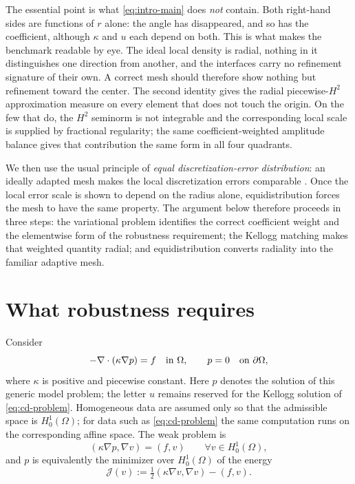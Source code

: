 \documentclass[10pt,pdftex]{amsart}%
\numberwithin{equation}{section}
\newcommand{\Jcal}{\mathcal{J}}
\begin{document}
The essential point is what \eqref{eq:intro-main} does \emph{not} contain.  Both right-hand sides are functions of $r$ alone: the angle has disappeared, and so has the coefficient, although $\kappa$ and $u$ each depend on both.  This is what makes the benchmark readable by eye.  The ideal local density is radial, nothing in it distinguishes one direction from another, and the interfaces carry no refinement signature of their own.  A correct mesh should therefore show nothing but refinement toward the center.  The second identity gives the radial piecewise-$H^2$ approximation measure on every element that does not touch the origin.  On the few that do, the $H^2$ seminorm is not integrable and the corresponding local scale is supplied by fractional regularity; the same coefficient-weighted amplitude balance gives that contribution the same form in all four quadrants.

We then use the usual principle of \emph{equal discretization-error distribution}: an ideally adapted mesh makes the local discretization errors comparable \cite{NV2012,CHZ17}.  Once the local error scale is shown to depend on the radius alone, equidistribution forces the mesh to have the same property.  The argument below therefore proceeds in three steps: the variational problem identifies the correct coefficient weight and the elementwise form of the robustness requirement; the Kellogg matching makes that weighted quantity radial; and equidistribution converts radiality into the familiar adaptive mesh.

\section{What robustness requires}
\label{sec:energy}

Consider
\begin{equation}\label{eq:diffusion}
  -\nabla\cdot(\kappa\nabla p)=f \quad\hbox{in }\Omega,
  \qquad p=0 \quad\hbox{on }\partial\Omega,
\end{equation}
where $\kappa$ is positive and piecewise constant.  Here $p$ denotes the solution of this generic model problem; the letter $u$ remains reserved for the Kellogg solution of \eqref{eq:cd-problem}.  Homogeneous data are assumed only so that the admissible space is $H_0^1(\Omega)$; for data such as \eqref{eq:cd-problem} the same computation runs on the corresponding affine space.  The weak problem is
\begin{equation}\label{eq:weak}
  (\kappa\nabla p,\nabla v)=(f,v)
  \qquad\forall v\in H_0^1(\Omega),
\end{equation}
and $p$ is equivalently the minimizer over $H_0^1(\Omega)$ of the energy
\begin{equation}\label{eq:energy-functional}
  \Jcal(v):=\tfrac12(\kappa\nabla v,\nabla v)-(f,v).
\end{equation}
\end{document}

